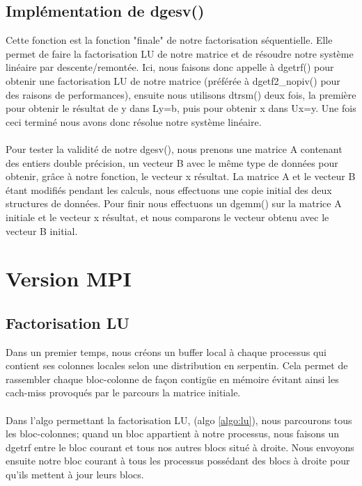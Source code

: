 \documentclass{article}
\begin{document}
\subsection{Implémentation de dgesv()}Cette fonction est la fonction "finale" de notre factorisation séquentielle. Elle permet de faire la factorisation LU de notre matrice et de résoudre notre système linéaire par descente/remontée. Ici, nous faisons donc appelle à dgetrf() pour obtenir une factorisation LU de notre matrice (préférée à dgetf2\_nopiv() pour des raisons de performances), ensuite nous utilisons dtrsm() deux fois, la première pour obtenir le résultat de y dans Ly=b, puis pour obtenir x dans Ux=y. Une fois ceci terminé nous avons donc résolue notre système linéaire.

\paragraph{}Pour tester la validité de notre dgesv(), nous prenons une matrice A contenant des entiers double précision, un vecteur B avec le même type de données pour obtenir, grâce à notre fonction, le vecteur x résultat. La matrice A et le vecteur B étant modifiés pendant les calculs, nous effectuons une copie initial des deux structures de données. Pour finir nous effectuons un dgemm() sur la matrice A initiale et le vecteur x résultat, et nous comparons le vecteur obtenu avec le vecteur B initial.

\section{Version MPI}
\subsection{Factorisation LU}
Dans un premier temps, nous créons un buffer local à chaque processus qui contient ses colonnes locales selon une distribution en serpentin. Cela permet de rassembler chaque bloc-colonne de façon contigüe en mémoire évitant ainsi les cach-miss provoqués par le parcours la matrice initiale.

\paragraph{}
Dans l'algo permettant la factorisation LU, (algo \ref{algo:lu}), nous parcourons tous les bloc-colonnes; quand un bloc appartient à notre processus, nous faisons un dgetrf entre le bloc courant et tous nos autres blocs situé à droite. Nous envoyons ensuite notre bloc courant à tous les processus possédant des blocs à droite pour qu'ils mettent à jour leurs blocs. 
\end{document}
